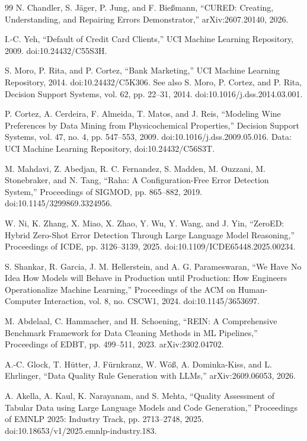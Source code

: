 \documentclass[11pt,a4paper]{article}
\begin{document}
\begin{thebibliography}{99}
 N. Chandler, S. J\"ager, P. Jung, and F. Bie{\ss}mann, ``CURED: Creating, Understanding, and Repairing Errors Demonstrator,'' arXiv:2607.20140, 2026.

 I.-C. Yeh, ``Default of Credit Card Clients,'' UCI Machine Learning Repository, 2009. doi:10.24432/C55S3H.

 S. Moro, P. Rita, and P. Cortez, ``Bank Marketing,'' UCI Machine Learning Repository, 2014. doi:10.24432/C5K306. See also S. Moro, P. Cortez, and P. Rita, Decision Support Systems, vol. 62, pp. 22--31, 2014. doi:10.1016/j.dss.2014.03.001.

 P. Cortez, A. Cerdeira, F. Almeida, T. Matos, and J. Reis, ``Modeling Wine Preferences by Data Mining from Physicochemical Properties,'' Decision Support Systems, vol. 47, no. 4, pp. 547--553, 2009. doi:10.1016/j.dss.2009.05.016. Data: UCI Machine Learning Repository, doi:10.24432/C56S3T.

 M. Mahdavi, Z. Abedjan, R. C. Fernandez, S. Madden, M. Ouzzani, M. Stonebraker, and N. Tang, ``Raha: A Configuration-Free Error Detection System,'' Proceedings of SIGMOD, pp. 865--882, 2019. doi:10.1145/3299869.3324956.

 W. Ni, K. Zhang, X. Miao, X. Zhao, Y. Wu, Y. Wang, and J. Yin, ``ZeroED: Hybrid Zero-Shot Error Detection Through Large Language Model Reasoning,'' Proceedings of ICDE, pp. 3126--3139, 2025. doi:10.1109/ICDE65448.2025.00234.

 S. Shankar, R. Garcia, J. M. Hellerstein, and A. G. Parameswaran, ``We Have No Idea How Models will Behave in Production until Production: How Engineers Operationalize Machine Learning,'' Proceedings of the ACM on Human-Computer Interaction, vol. 8, no. CSCW1, 2024. doi:10.1145/3653697.

 M. Abdelaal, C. Hammacher, and H. Schoening, ``REIN: A Comprehensive Benchmark Framework for Data Cleaning Methods in ML Pipelines,'' Proceedings of EDBT, pp. 499--511, 2023. arXiv:2302.04702.

 A.-C. Glock, T. H\"utter, J. F\"urnkranz, W. W\"o{\ss}, A. Dominka-Kiss, and L. Ehrlinger, ``Data Quality Rule Generation with LLMs,'' arXiv:2609.06053, 2026.

 A. Akella, A. Kaul, K. Narayanam, and S. Mehta, ``Quality Assessment of Tabular Data using Large Language Models and Code Generation,'' Proceedings of EMNLP 2025: Industry Track, pp. 2713--2748, 2025. doi:10.18653/v1/2025.emnlp-industry.183.


\end{thebibliography}
\end{document}

